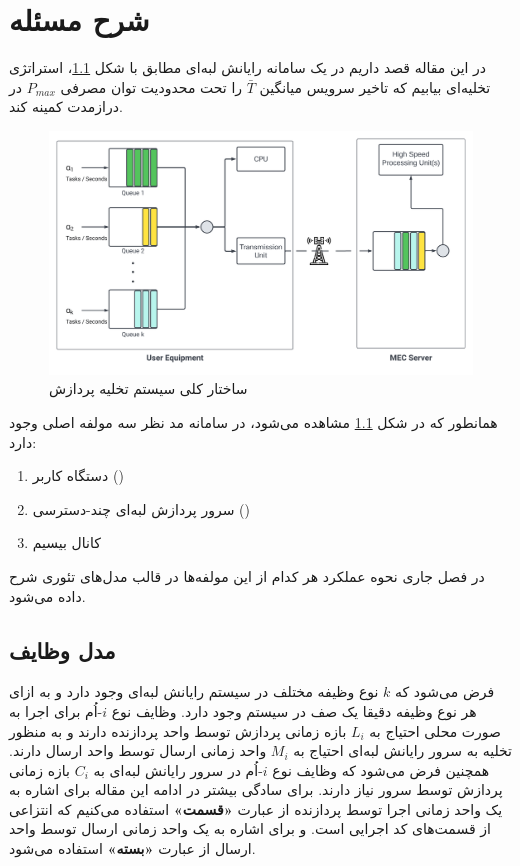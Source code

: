\chapter{شرح مسئله}
در این مقاله قصد داریم در یک سامانه رایانش لبه‌ای مطابق با شکل \ref{fig-offloading-system}، استراتژی تخلیه‌ای بیابیم که تاخیر سرویس میانگین $\bar{T}$ را تحت محدودیت توان مصرفی $P_{m a x}$ در درازمدت کمینه کند.
\begin{figure}[H]
	\centering
	\includegraphics*[width=\textwidth]{figures/MEC5.png}
	\caption{ساختار کلی سیستم تخلیه پردازش}
	\label{fig-offloading-system}
\end{figure}
\newpage
همانطور که در شکل \ref{fig-offloading-system} مشاهده می‌شود، در سامانه مد نظر سه مولفه اصلی وجود دارد:
\begin{enumerate}
	\item دستگاه کاربر ()
	\item سرور پردازش لبه‌ای چند-دسترسی ()
	\item کانال بیسیم
\end{enumerate}
در فصل جاری نحوه عملکرد هر کدام از این مولفه‌ها در قالب مدل‌های تئوری شرح داده می‌شود.

\section{مدل وظایف}
فرض می‌شود که \(k\) نوع وظیفه مختلف در سیستم رایانش لبه‌ای وجود دارد و به ازای هر نوع وظیفه دقیقا یک صف در سیستم وجود دارد. وظایف نوع \(i\)-اُم برای اجرا به صورت محلی احتیاج به \(L_i\) بازه زمانی پردازش توسط واحد پردازنده دارند و به منظور تخلیه به سرور رایانش لبه‌ای احتیاج به \(M_i\) واحد زمانی ارسال توسط واحد ارسال دارند. همچنین فرض می‌شود که وظایف نوع \(i\)-اُم در سرور رایانش لبه‌ای به \(C_i\) بازه زمانی پردازش توسط سرور نیاز دارند. برای سادگی بیشتر در ادامه این مقاله برای اشاره به یک واحد زمانی اجرا توسط پردازنده از عبارت \textbf{«قسمت»} استفاده می‌کنیم که انتزاعی از قسمت‌های کد اجرایی است. و برای اشاره به یک واحد زمانی ارسال توسط واحد ارسال از عبارت\textbf{ «بسته» }استفاده می‌شود.
\newpage
